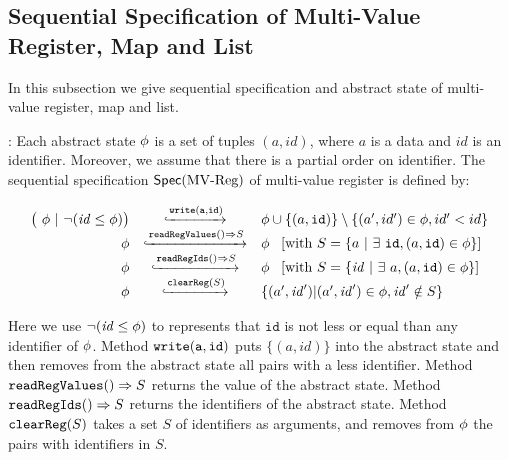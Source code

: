 \subsection{Sequential Specification of Multi-Value Register, Map and List}
\label{subsec:sequential specification of multi-value register, map and list} 

In this subsection we give sequential specification and abstract state of multi-value register, map and list. 


: %
Each abstract state $\phi$ is a set of tuples $(a,id)$, where $a$ is a data and $id$ is an identifier. Moreover, we assume that there is a partial order on identifier. The sequential specification $\mathsf{Spec}(\text{MV\text{-}Reg})$ of multi-value register is defined by:

\[
  \begin{array}{rcl}
    \big(\ \abstate\ |\ \neg (\mathit{id} \leq \abstate) \big)
             & \specarrow{ \alabelshort[{\tt write}]{a,id} }
    & \abstate \cup \{ (a,\mathtt{id}) \} \setminus \{ (a',id') \in \abstate, id' < id \} \\
    \abstate
    & \specarrow{\alabellong[\mathtt{readRegValues}]{}{ S }{}}
    & \abstate\
      \begin{array}{c}
        [\text{with}\ S = \{ a\ \vert\ \exists\ \mathtt{id}, (a,\mathtt{id}) \in \abstate \}]
      \end{array}\\ 
    \abstate
    & \specarrow{\alabellong[\mathtt{readRegIds}]{}{ S }{}}
    & \abstate\
      \begin{array}{c}
        [\text{with}\ S = \{ \mathit{id}\ \vert\ \exists\ a, (a,\mathtt{id}) \in \abstate \}]
      \end{array}\\ 
    \abstate
    & \specarrow{{\tt clearReg}(S)}
    & \{ (a',\mathit{id}') \vert (a',\mathit{id}') \in \abstate, \mathit{id}' \notin S \}
  \end{array}
\] 

Here we use $\neg (\mathit{id} \leq \phi)$ to represents that $\mathtt{id}$ is not less or equal than any identifier of $\phi$. Method $\alabelshort[{\tt write}]{a,id}$ puts $\{ (a,id) \}$ into the abstract state and then removes from the abstract state all pairs with a less identifier. Method ${\tt readRegValues}()\Rightarrow S$ returns the value of the abstract state. Method ${\tt readRegIds}()\Rightarrow S$ returns the identifiers of the abstract state. Method ${\tt clearReg}(S)$ takes a set $S$ of identifiers as arguments, and removes from $\phi$ the pairs with identifiers in $S$.


